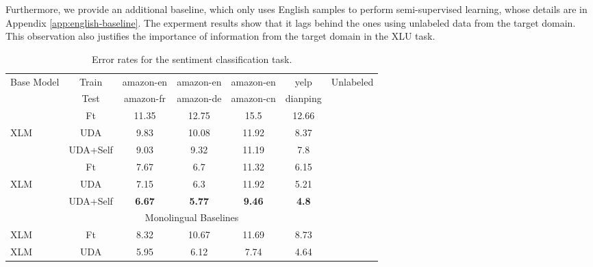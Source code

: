 \documentclass{article} \usepackage{iclr2020_conference,times}
\newcommand{\cmark}{\ding{51}}\newcommand{\xmark}{\ding{55}}\usepackage{hyperref}       \usepackage{url}            \usepackage{booktabs}       \usepackage[inline]{enumitem}
\begin{document}
Furthermore, we provide an additional baseline, which only uses English samples to perform semi-supervised learning, whose details are in Appendix \ref{app:english-baseline}. The experment results show that it lags behind the ones using unlabeled data from the target domain. This observation also justifies the importance of information from the target domain in the XLU task. 

\begin{table}[!ht]
\centering
    \begin{tabular}{l|c|cccc|c}
        \toprule
        Base Model & Train    & amazon-en & amazon-en & amazon-en & yelp     & Unlabeled \\
        & Test     & amazon-fr & amazon-de & amazon-cn & dianping &\\
        \midrule
        & Ft       & 11.35     & 12.75     & 15.5     &  12.66    & \xmark\\
        XLM        & UDA      & 9.83      & 10.08     & 11.92      &  8.37   & \cmark\\
        & UDA+Self & 9.03      & 9.32      & 11.19      &  7.8   & \cmark\\
        \midrule
        & Ft       & 7.67      & 6.7       & 11.32      &  6.15   & \cmark\\
        XLM     & UDA      & 7.15      & 6.3       & 11.92      &  5.21   & \cmark\\
        & UDA+Self & \textbf{6.67}      & \textbf{5.77}      & \textbf{9.46}       &  \textbf{4.8}    & \cmark\\
        \midrule
        \midrule
        \multicolumn{7}{c}{Monolingual Baselines}  \\
        \midrule
        XLM & Ft & 8.32 & 10.67 & 11.69 & 8.73 & \xmark \\
        \midrule 
        XLM & UDA &  5.95 & 6.12 & 7.74 & 4.64 & \cmark \\ 
        \bottomrule
    \end{tabular}
    \caption{Error rates for the sentiment classification task.}
\label{tab:sentiment1}
\end{table}
\end{document}
